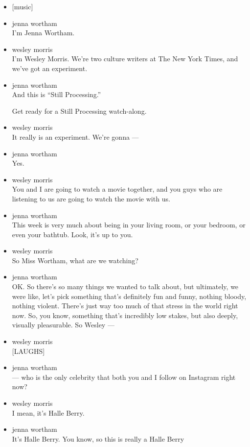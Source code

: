 \begin{itemize}
\item
  {[}music{]}
\item
  jenna wortham\\
  I'm Jenna Wortham.
\item
  wesley morris\\
  I'm Wesley Morris. We're two culture writers at The New York Times,
  and we've got an experiment.
\item
  jenna wortham\\
  And this is ``Still Processing.''

  Get ready for a Still Processing watch-along.
\item
  wesley morris\\
  It really is an experiment. We're gonna ---
\item
  jenna wortham\\
  Yes.
\item
  wesley morris\\
  You and I are going to watch a movie together, and you guys who are
  listening to us are going to watch the movie with us.
\item
  jenna wortham\\
  This week is very much about being in your living room, or your
  bedroom, or even your bathtub. Look, it's up to you.
\item
  wesley morris\\
  So Miss Wortham, what are we watching?
\item
  jenna wortham\\
  OK. So there's so many things we wanted to talk about, but ultimately,
  we were like, let's pick something that's definitely fun and funny,
  nothing bloody, nothing violent. There's just way too much of that
  stress in the world right now. So, you know, something that's
  incredibly low stakes, but also deeply, visually pleasurable. So
  Wesley ---
\item
  wesley morris\\
  {[}LAUGHS{]}
\item
  jenna wortham\\
  --- who is the only celebrity that both you and I follow on Instagram
  right now?
\item
  wesley morris\\
  I mean, it's Halle Berry.
\item
  jenna wortham\\
  It's Halle Berry. You know, so this is really a Halle Berry

\end{itemize}
